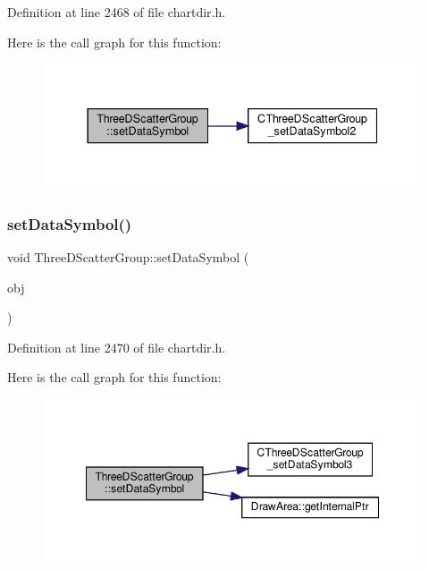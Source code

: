 Definition at line 2468 of file chartdir.\+h.

Here is the call graph for this function\+:
\nopagebreak
\begin{figure}[H]
\begin{center}
\leavevmode
\includegraphics[width=337pt]{class_three_d_scatter_group_ab34e6305a2ee0a3b536d1e3144343dc4_cgraph}
\end{center}
\end{figure}
\mbox{\label{class_three_d_scatter_group_aa656b4d391c2ff8594667cf1f62aedc3}} 
\subsubsection{\texorpdfstring{set\+Data\+Symbol()}{setDataSymbol()}\hspace{0.1cm}{\footnotesize\ttfamily [3/4]}}
{\footnotesize\ttfamily void Three\+D\+Scatter\+Group\+::set\+Data\+Symbol (\begin{DoxyParamCaption}\item[{const \hyperlink{class_draw_area}{Draw\+Area} $\ast$}]{obj }\end{DoxyParamCaption})\hspace{0.3cm}{\ttfamily [inline]}}



Definition at line 2470 of file chartdir.\+h.

Here is the call graph for this function\+:
\nopagebreak
\begin{figure}[H]
\begin{center}
\leavevmode
\includegraphics[width=348pt]{class_three_d_scatter_group_aa656b4d391c2ff8594667cf1f62aedc3_cgraph}
\end{center}
\end{figure}
\mbox{\label{class_three_d_scatter_group_a300cece2b98d9b32714dde52c96b58e1}} 
